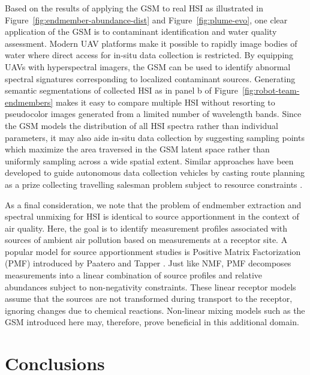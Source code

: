 \documentclass[remotesensing,article,submit,pdftex,moreauthors]{Definitions/mdpi}
\begin{document}
Based on the results of applying the GSM to real HSI as illustrated in Figure~\ref{fig:endmember-abundance-dist} and Figure~\ref{fig:plume-evo}, one clear application of the GSM is to contaminant identification and water quality assessment. Modern UAV platforms make it possible to rapidly image bodies of water where direct access for in-situ data collection is restricted. By equipping UAVs with hyperspectral imagers, the GSM can be used to identify abnormal spectral signatures corresponding to localized contaminant sources. Generating semantic segmentations of collected HSI as in panel b of Figure~\ref{fig:robot-team-endmembers} makes it easy to compare multiple HSI without resorting to pseudocolor images generated from a limited number of wavelength bands. Since the GSM models the distribution of all HSI spectra rather than individual parameters, it may also aide in-situ data collection by suggesting sampling points which maximize the area traversed in the GSM latent space rather than uniformly sampling across a wide spatial extent. Similar approaches have been developed to guide autonomous data collection vehicles by casting route planning as a prize collecting travelling salesman problem subject to resource constraints \cite{balas2007prize, suryan2020learning}.

As a final consideration, we note that the problem of endmember extraction and spectral unmixing for HSI is identical to source apportionment in the context of air quality. Here, the goal is to identify measurement profiles associated with sources of ambient air pollution based on measurements at a receptor site. A popular model for source apportionment studies is Positive Matrix Factorization (PMF) introduced by Paatero and Tapper \cite{pmf-orig, ulbrich2009interpretation}. Just like NMF, PMF decomposes measurements into a linear combination of source profiles and relative abundances subject to non-negativity constraints. These linear receptor models assume that the sources are not transformed during transport to the receptor, ignoring changes due to chemical reactions. Non-linear mixing models such as the GSM introduced here may, therefore, prove beneficial in this additional domain.


\section{Conclusions}\label{sec:conclusions}
\end{document}
